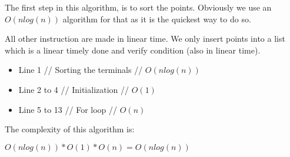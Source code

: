 The first step in this algorithm, is to sort the points. Obviously we use an $O(nlog(n))$ algorithm for that as it is the quickest way to do so.

All other instruction are made in linear time. We only insert points into a list which is a linear timely done and verify condition (also in linear time).
\begin{itemize}[noitemsep, nolistsep]
	\item{Line 1 // Sorting the terminals // $O(nlog(n))$}
	\item{Line 2 to 4 // Initialization // $O(1)$}
	\item{Line 5 to 13 // For loop // $O(n)$}
\end{itemize}

\noindent The complexity of this algorithm is:

$O(nlog(n)) * O(1) * O(n) = O(nlog(n))$